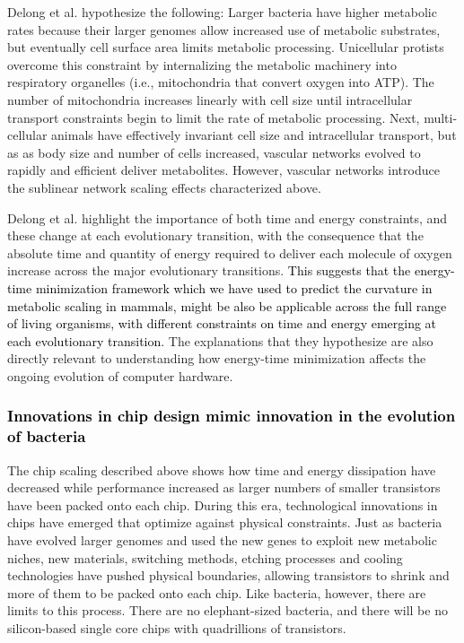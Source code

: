 \documentclass[12pt]{article}
\newcommand{\red}[1]{\textcolor{black}{#1}}
\begin{document}
Delong et al. hypothesize the following: Larger bacteria have higher metabolic rates because their larger genomes allow increased use of
metabolic substrates, but eventually cell surface area limits metabolic
processing. Unicellular protists overcome this constraint by internalizing the metabolic machinery into
respiratory organelles (i.e., mitochondria that convert oxygen into ATP). The
number of mitochondria increases linearly with cell size until intracellular
transport constraints begin to limit the rate of metabolic processing.
Next, multi-cellular
animals have effectively invariant cell size and intracellular transport, but as as body size and number of cells increased, vascular networks evolved to rapidly and efficient deliver metabolites. However, vascular networks introduce the sublinear network scaling effects characterized above. 

Delong et al. highlight the
importance of both time and energy constraints, and these change at each evolutionary transition, with the consequence that the absolute time and quantity of
energy required to deliver each molecule of oxygen increase across the major evolutionary transitions. \red{This suggests that the energy-time minimization framework which we have used to predict the curvature in metabolic scaling in mammals, might be also be applicable across the full range of living organisms, with different constraints on time and energy emerging at each evolutionary transition.} The explanations that they hypothesize are also directly relevant
to understanding how energy-time minimization affects the ongoing evolution of
computer hardware.

\red{\subsubsection{Innovations in chip design mimic innovation in the evolution of bacteria}} The chip scaling described above
shows how time and energy dissipation have decreased while performance
increased as larger numbers of smaller transistors have been packed
onto each chip. During this era, technological innovations in chips
have emerged that optimize against physical constraints.  Just as
bacteria have evolved larger genomes and used the new genes to exploit
new metabolic niches, new materials, switching methods, etching
processes and cooling technologies have pushed physical boundaries,
allowing transistors to shrink and more of them to be packed onto each
chip. Like bacteria, however, there are limits to this process.  There are no elephant-sized bacteria, and there will be no
silicon-based single core chips with quadrillions of transistors.
\end{document}
